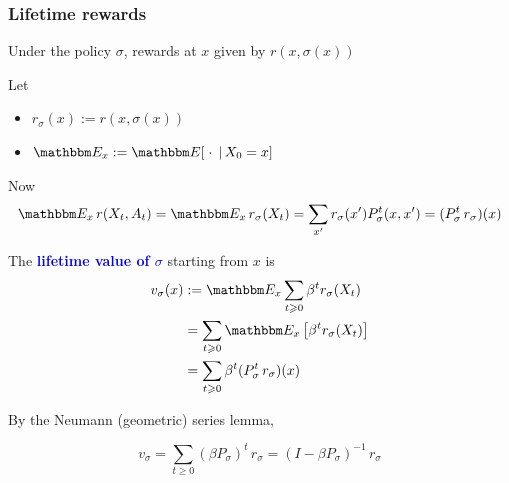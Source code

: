 \documentclass[xcolor=dvipsnames]{beamer}
\renewcommand{\geq}{\geqslant}
\newcommand{\navy}[1]{\textcolor{Blue}{\bf #1}}
\newcommand{\EE}{\mathbbm E}
\renewcommand{\geq}{\geqslant}
\newcommand{\given}{\, | \,}
\newcommand{\1}{\mathbbm 1}
\begin{document}
\begin{frame}
    \frametitle{Lifetime rewards}
    
    Under the policy $\sigma$, rewards at $x$ given by $r(x, \sigma(x))$  

    \vspace{0.5em}
    Let
    \begin{itemize}
        \item $r_\sigma(x) := r(x, \sigma(x))$
        \vspace{0.5em}
        \item $\EE_x := \EE[ \; \cdot \; \given X_0 = x]$
    \end{itemize}

    \vspace{0.5em}
    \vspace{0.5em}
    Now
    \begin{equation*}
        \EE_x  \, r(X_t, A_t) 
         = \EE_x  \, r_\sigma(X_t)  
         = \sum_{x'} r_\sigma(x') P_\sigma^t (x, x')
        = (P_\sigma^t \, r_\sigma) (x)
    \end{equation*}

\end{frame}



\begin{frame}

    
    \vspace{0.5em}
    \vspace{0.5em}
    The \navy{lifetime value of $\sigma$} starting from $x$ is
    \begin{align*}
        v_\sigma (x) 
        & := \EE_x 
            \sum_{t \geq 0} \beta^t r_\sigma(X_t) 
            \\
        & = \sum_{t \geq 0} \EE_x \left[ \beta^t r_\sigma(X_t) \right]
            \\
        & = \sum_{t \geq 0} \beta^t (P_\sigma^t \, r_\sigma)(x)
    \end{align*}


    \vspace{0.5em}
    By the Neumann (geometric) series lemma,

    \begin{equation*}
        v_\sigma 
        = \sum_{t \geq 0} (\beta P_\sigma)^t \, r_\sigma
        = (I - \beta P_\sigma)^{-1} \, r_\sigma 
    \end{equation*}


\end{frame}
\end{document}
